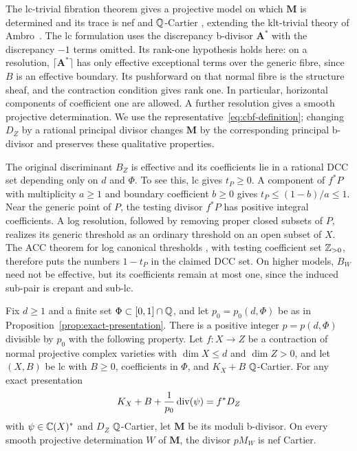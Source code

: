 The lc-trivial fibration theorem gives a projective model on which
$\mathbf M$ is determined and its trace is nef and $\mathbb Q$-Cartier
\cite[Theorem~3.6]{FG}, extending the klt-trivial theory of
Ambro~\cite{AmbroBoundary,Ambro}.  The lc formulation
uses the discrepancy b-divisor $\mathbf A^*$ with the discrepancy $-1$
terms omitted.  Its rank-one hypothesis holds here: on a resolution,
$\lceil\mathbf A^*\rceil$ has only effective exceptional terms over the
generic fibre, since $B$ is an effective boundary.  Its pushforward on
that normal fibre is the structure sheaf, and the contraction condition
gives rank one.  In particular, horizontal components of coefficient one
are allowed.  A further resolution gives a smooth projective
determination.  We use the representative~\eqref{eq:cbf-definition};
changing $D_Z$ by a rational principal divisor changes $\mathbf M$ by
the corresponding principal b-divisor and preserves these qualitative
properties.

The original discriminant $B_Z$ is effective and its coefficients lie in
a rational DCC set depending only on $d$ and $\Phi$.  To see this, lc
gives $t_P\geq0$.  A component of $f^*P$ with multiplicity $a\geq1$
and boundary coefficient $b\geq0$ gives
$t_P\leq(1-b)/a\leq1$.  Near the generic point of $P$, the testing
divisor $f^*P$ has positive integral coefficients.  A log resolution,
followed by removing proper closed subsets of $P$, realizes its generic
threshold as an ordinary threshold on an open subset of $X$.
The ACC theorem for log canonical thresholds
\cite[Theorem~1.1]{HMX}, with testing coefficient set
$\mathbb Z_{>0}$, therefore puts the numbers $1-t_P$ in the claimed DCC set.
On higher models, $B_W$ need not be effective, but its coefficients
remain at most one, since the induced sub-pair is crepant and sub-lc.

\begin{theorem}
\label{thm:moduli-denominator}
Fix $d\geq1$ and a finite set $\Phi\subset[0,1]\cap\mathbb Q$, and let
$p_0=p_0(d,\Phi)$ be as in
Proposition~\ref{prop:exact-presentation}.  There is a positive integer
$p=p(d,\Phi)$ divisible by $p_0$ with the following property.
Let $f:X\to Z$ be a contraction of normal projective complex varieties
with $\dim X\leq d$ and $\dim Z>0$, and let $(X,B)$ be lc with
$B\geq0$, coefficients in $\Phi$, and $K_X+B$ $\mathbb Q$-Cartier.
For any exact presentation
\[
 K_X+B+\frac1{p_0}\operatorname{div}(\psi)=f^*D_Z
\]
with $\psi\in\mathbb C(X)^*$ and $D_Z$ $\mathbb Q$-Cartier, let $\mathbf M$ be
its moduli b-divisor.
On every smooth projective determination $W$ of $\mathbf M$,
the divisor $pM_W$ is nef Cartier.
\end{theorem}

